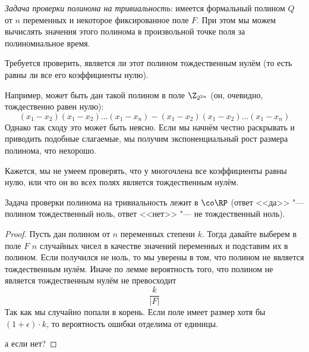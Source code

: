 	\begin{Def}
		\textit{Задача проверки полинома на тривиальность}: имеется формальный полином $Q$ от $n$ переменных и некоторое фиксированное поле $F$.
		При этом мы можем вычислять значения этого полинома в произвольной точке поля за полиномиальное время.

		Требуется проверить, является ли этот полином тождественным нулём (то есть равны ли все его коэффициенты нулю).
	\end{Def}
	\begin{exmp}
		Например, может быть дан такой полином в поле $\Z_{2^{2n}}$ (он, очевидно, тождественно равен нулю):
		\[
			(x_1-x_2)(x_1-x_2)\dots (x_1-x_n) - (x_1-x_2)(x_1-x_2)\dots (x_1-x_n)
		\]
		Однако так сходу это может быть неясно.
		Если мы начнём честно раскрывать и приводить подобные слагаемые, мы получим экспоненциальный рост размера полинома, что нехорошо.
	\end{exmp}
	\begin{Rem}
		\TODO Кажется, мы не умеем проверять, что у многочлена все коэффициенты равны нулю, или что он во всех полях является тождественным нулём.
	\end{Rem}
	\begin{assertion}
		Задача проверки полинома на тривиальность лежит в $\co\RP$ (ответ <<да>> "--- полином тождественный ноль, ответ <<нет>> "--- не тождественный ноль).
	\end{assertion}
	\begin{proof}
		Пусть дан полином от $n$ переменных степени $k$.
		Тогда давайте выберем в поле $F$ $n$ случайных чисел в качестве значений переменных и подставим их в полином.
		Если получился не ноль, то мы уверены в том, что полином не является тождественным нулём.
		Иначе по лемме вероятность того, что полином не является тождественным нулём не превосходит
		\[
			\frac{k}{|F|}
		\]
		Так как мы случайно попали в корень.
		Если поле имеет размер хотя бы $(1+\epsilon) \cdot k$, то вероятность ошибки отделима от единицы.

		\TODO а если нет?
	\end{proof}
